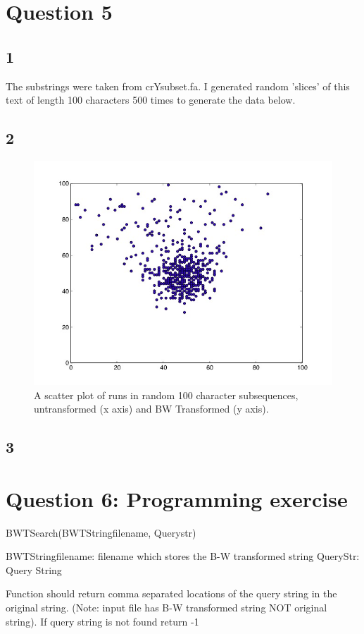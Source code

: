 \documentclass[12pt]{article}
\begin{document}

\section*{Question 5}
\subsection*{1} The substrings were taken from crYsubset.fa.  I generated random 'slices' of this text of length 100 characters 500 times to generate the data below.


\subsection*{2}
\begin{figure}[h]
\centering
\includegraphics[width=4.5in]{scatter.jpg}
\caption{A scatter plot of runs in random 100 character subsequences, untransformed (x axis) and BW Transformed (y axis).}
\label{scatter}
\end{figure}

\subsection*{3}

\section*{Question 6: Programming exercise}

BWTSearch(BWTStringfilename, Querystr)

BWTStringfilename: filename which stores the B-W transformed string
QueryStr: Query String

Function should return comma separated locations of the query string in the original string. (Note: input file has B-W transformed string NOT original string). If query string is not found return -1
\end{document}
